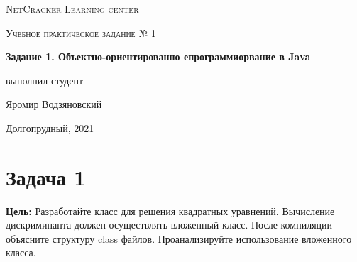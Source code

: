 \documentclass[a4paper]{article}
\begin{document}
\graphicspath{ {pictures/} }

\begin{titlepage}
	\centering
	\vspace{5cm}
    {\scshape\LARGE NetCracker Learning center\par}
	\vspace{5cm}
	{\scshape\Large  Учебное практическое задание № 1 \par}
	\vspace{1cm}
    {\huge\bfseries  Задание 1. Объектно-ориентированно епрограммиорвание в Java \par}
	\vspace{1cm}
	\vfill
    \begin{flushright}
        {\large выполнил студент}\par
        \vspace{0.3cm}
        {\LARGE Яромир Водзяновский}
    \end{flushright}
	\vfill
Долгопрудный, 2021
\end{titlepage}

\pagestyle{fancy} 
\fancyfoot[C]{ \noindent\rule{\textwidth}{0.4pt} \thepage }



\newpage

\section{Задача 1}

\textbf{Цель:} Разработайте класс для решения квадратных уравнений. Вычисление дискриминанта должен осуществлять вложенный класс. После компиляции объясните структуру class файлов. Проанализируйте использование вложенного класса. \par
\end{document}
